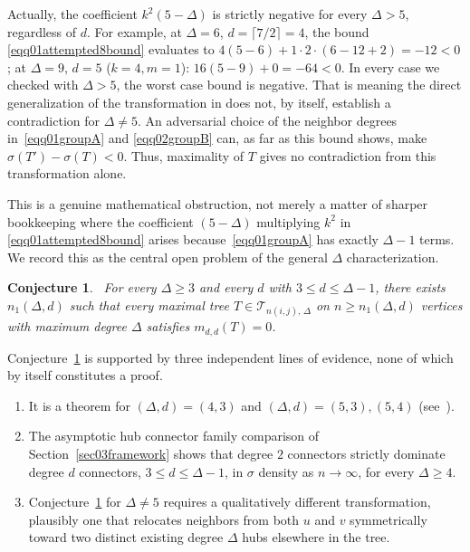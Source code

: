 \documentclass[12pt]{amsart}
\newtheorem{conjecture}[theorem]{Conjecture}
\newcommand{\TT}{\mathcal{T}}
\begin{document}
Actually, the coefficient $k^2(5-\Delta)$ is strictly negative for every $\Delta>5$, regardless of $d$. For example, at $\Delta=6$, $d=\lceil7/2\rceil=4$, the bound
\eqref{eqq01attempted8bound} evaluates to
$4(5-6)+1\cdot2\cdot(6-12+2)=-12<0$; at $\Delta=9$, $d=5$ ($k=4,m=1$):
$16(5-9)+0=-64<0$. In every case we checked with $\Delta>5$, the worst case
bound is negative. That is meaning the direct generalization of the
transformation in \cite[Lemma~8]{DimitrovPaper2025} does not, by itself,
establish a contradiction for $\Delta\ne5$. An adversarial choice of the neighbor degrees in~\eqref{eqq01groupA} and \eqref{eqq02groupB} can, as far as this bound shows, make
$\sigma(T')-\sigma(T)<0$. Thus, maximality of $T$ gives no contradiction from this transformation alone.

This is a genuine mathematical obstruction, not merely a matter of sharper bookkeeping where the coefficient $(5-\Delta)$ multiplying $k^2$ in \eqref{eqq01attempted8bound} arises because~\eqref{eqq01groupA} has exactly $\Delta-1$
terms. We record this as the central open problem of the general $\Delta$ characterization.

\begin{conjecture}~\label{conj002mddzero}
For every $\Delta\ge3$ and every $d$ with $3\le d\le\Delta-1$, there exists $n_1(\Delta,d)$ such that every maximal tree $T\in \TT_{n(i,j),\,\Delta}$ on $n\geqslant n_1(\Delta,d)$
vertices with maximum degree $\Delta$ satisfies $m_{d,d}(T)=0$.
\end{conjecture}

Conjecture~\ref{conj002mddzero} is supported by three independent lines of evidence, none of which by itself constitutes a proof. 
\begin{enumerate}
    \item It is a theorem for $(\Delta,d)=(4,3)$ and $(\Delta,d)=(5,3),(5,4)$ (see~\cite{VukicevicEtAl2024,DimitrovPaper2025}).
\item  The asymptotic hub connector family comparison of
Section~\ref{sec03framework} shows that degree $2$ connectors strictly dominate degree $d$ connectors, $3\leqslant d\leqslant \Delta-1$, in $\sigma$ density as $n\to\infty$, for every
$\Delta\ge4$.

\item  Conjecture~\ref{conj002mddzero} for $\Delta\ne 5$ requires a
 qualitatively different transformation, plausibly one that
relocates neighbors from  both  $u$ and $v$ symmetrically toward two distinct  existing degree $\Delta$ hubs elsewhere in the tree.
\end{enumerate}
\end{document}
